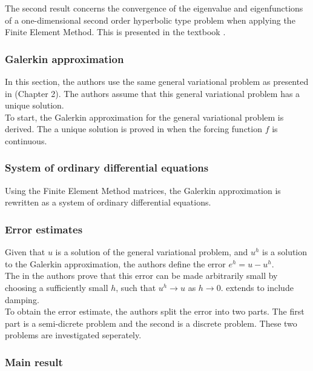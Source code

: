 \documentclass[../main.tex]{subfiles}
\begin{document}
The second result concerns the convergence of the eigenvalue and eigenfunctions of a one-dimensional second order hyperbolic type problem when applying the Finite Element Method. This is presented in the textbook \cite{SF97}.

\subsubsection{Galerkin approximation}
In this section, the authors use the same general variational problem as presented in \cite{VV02} (Chapter 2). The authors assume that this general variational problem has a unique solution.\\

To start, the Galerkin approximation for the general variational problem is derived. The a unique solution is proved in \cite{BV13} when the forcing function $f$ is continuous.\\

\subsubsection{System of ordinary differential equations}

Using the Finite Element Method matrices, the Galerkin approximation is rewritten as a system of ordinary differential equations.

\subsubsection{Error estimates}
Given that $u$ is a solution of the general variational problem, and $u^h$ is a solution to the Galerkin approximation, the authors define the error $e^h = u - u^h$.\\

The in \cite{BV13} the authors prove that this error can be made arbitrarily small by choosing a sufficiently small $h$, such that $u^h \rightarrow u$ as $h \rightarrow 0$. \cite{BV18} extends \cite{BV13} to include damping.\\


To obtain the error estimate, the authors split the error into two parts. The first part is a semi-dicrete problem and the second is a discrete problem. These two problems are investigated seperately.

\subsubsection{Main result}
\end{document}
